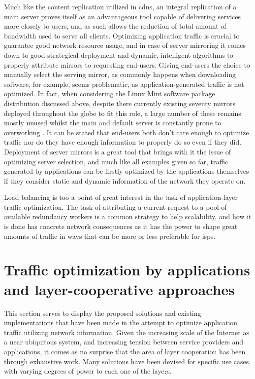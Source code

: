     Much like the content replication utilized in \glspl{cdn}, an integral replication of a main server proves itself as an advantageous tool capable of delivering services more closely to users, and as such allows the reduction of total amount of bandwidth used to serve all clients.
    Optimizing application traffic is crucial to guarantee good network resource usage, and in case of server mirroring it comes down to good strategical deployment and dynamic, intelligent algorithms to properly attribute mirrors to requesting end-users.
    Giving end-users the choice to manually select the serving mirror, as commonly happens when downloading software, for example, seems problematic, as application-generated traffic is not optimized.
    In fact, when considering the Linux Mint software package distribution discussed above, despite there currently existing seventy mirrors deployed throughout the globe to fit this role, a large number of these remains mostly unused whilst the main and default server is constantly prone to overworking \cite{mint-article}.
    It can be stated that end-users both don't care enough to optimize traffic nor do they have enough information to properly do so even if they did.
    Deployment of server mirrors is a great tool that brings with it the issue of optimizing server selection, and much like all examples given so far, traffic generated by applications can be firstly optimized by the applications themselves if they consider static and dynamic information of the network they operate on.

    Load balancing is too a point of great interest in the task of application-layer traffic optimization.
    The task of attributing a current request to a pool of available redundancy workers is a common strategy to help scalability, and how it is done has concrete network consequences as it has the power to shape great amounts of traffic in ways that can be more or less preferable for \glspl{isp}.


\section{Traffic optimization by applications and layer-cooperative approaches}

    This section serves to display the proposed solutions and existing implementations that have been made in the attempt to optimize application traffic utilizing network information.
    Given the increasing scale of the Internet as a near ubiquitous system, and increasing tension between service providers and applications, it comes as no surprise that the area of layer cooperation has been through exhaustive work.
    Many solutions have been devised for specific use cases, with varying degrees of power to each one of the layers.

